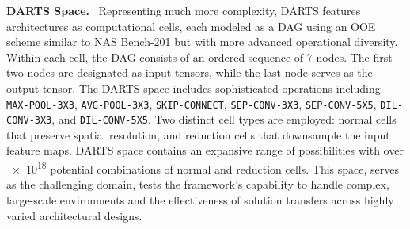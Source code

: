 \documentclass[../main.tex]{subfiles}
\begin{document}
\textbf{DARTS Space.}~\cite{DBLP:conf/iclr/LiuSY19}\quad
Representing much more complexity, DARTS features architectures as computational cells, each modeled as a DAG using an OOE scheme similar to NAS Bench-201 but with more advanced operational diversity.
Within each cell, the DAG consists of an ordered sequence of 7 nodes.
The first two nodes are designated as input tensors, while the last node serves as the output tensor.
The DARTS space includes sophisticated operations including \texttt{MAX-POOL-3X3}, \texttt{AVG-POOL-3X3}, \texttt{SKIP-CONNECT}, \texttt{SEP-CONV-3X3}, \texttt{SEP-CONV-5X5}, \texttt{DIL-CONV-3X3}, and \texttt{DIL-CONV-5X5}.
Two distinct cell types are employed: normal cells that preserve spatial resolution, and reduction cells that downsample the input feature maps.
DARTS space contains an expansive range of possibilities with over \num{e18} potential combinations of normal and reduction cells.
This space, serves as the challenging domain, tests the framework's capability to handle complex, large-scale environments and the effectiveness of solution transfers across highly varied architectural designs.
\end{document}
